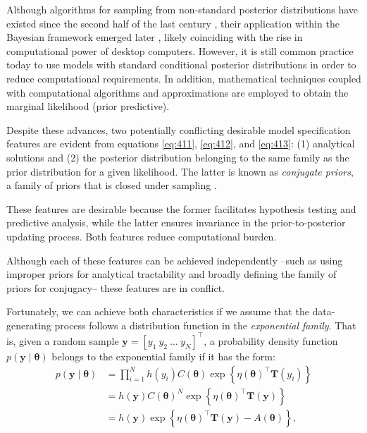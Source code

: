 Although algorithms for sampling from non-standard posterior distributions have existed since the second half of the last century \cite{metropolis53,hastings70,Geman1984}, their application within the Bayesian framework emerged later \cite{Gelfand1990,tierney1994markov}, likely coinciding with the rise in computational power of desktop computers. However, it is still common practice today to use models with standard conditional posterior distributions in order to reduce computational requirements. In addition, mathematical techniques coupled with computational algorithms \cite{gelfand1994bayesian, chib1995marginal, chib2001marginal} and approximations \cite{Tierney1986,Jordan1999} are employed to obtain the marginal likelihood (prior predictive).

Despite these advances, two potentially conflicting desirable model specification features are evident from equations \ref{eq:411}, \ref{eq:412}, and \ref{eq:413}: (1) analytical solutions and (2) the posterior distribution belonging to the same family as the prior distribution for a given likelihood. The latter is known as \textit{conjugate priors}, a family of priors that is closed under sampling \cite{schlaifer1961applied}.

These features are desirable because the former facilitates hypothesis testing and predictive analysis, while the latter ensures invariance in the prior-to-posterior updating process. Both features reduce computational burden.

Although each of these features can be achieved independently --such as using improper priors for analytical tractability and broadly defining the family of priors for conjugacy-- these features are in conflict.

Fortunately, we can achieve both characteristics if we assume that the data-generating process follows a distribution function in the \textit{exponential family}. That is, given a random sample $\bm{y}=[y_1 \ y_2 \ \dots \ y_N]^{\top}$, a probability density function $p(\bm{y}\mid \bm{\theta})$ belongs to the exponential family if it has the form:
\begin{align}
	p(\bm{y}\mid \bm{\theta})&=\prod_{i=1}^N h(y_i) C(\bm{\theta}) \exp\left\{\eta(\bm{\theta})^{\top}\bm{T}(y_i)\right\}\label{eq:414}\\ 
	&=h(\bm{y}) C(\bm{\theta})^N\exp\left\{\eta(\bm{\theta})^{\top}\bm{T}(\bm{y})\right\}\nonumber \\
	&=h(\bm{y})\exp\left\{\eta(\bm{\theta})^{\top}\bm{T}(\bm{y})-A(\bm{\theta})\right\}\nonumber,
\end{align}

